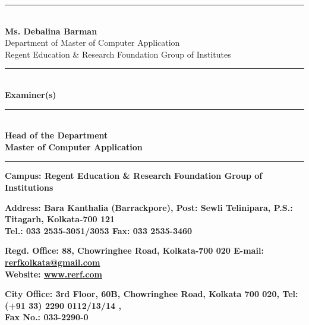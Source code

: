 \documentclass[12pt,a4paper]{report}
\begin{document}
\begin{center}
            \rule{8cm}{0.5pt} \\ %
            \textbf{Ms. Debalina Barman} \\[5pt]
            Department of Master of Computer Application\\
            Regent Education \& Research Foundation Group of Institutes

            \vspace{2cm}

            \noindent
            \begin{minipage}[t]{0.45\textwidth}
                \centering
                \rule{6cm}{0.5pt}\\
                \textbf{Examiner(s)}
            \end{minipage}%
            \hfill
            \begin{minipage}[t]{0.45\textwidth}
                \centering
                \rule{7cm}{0.5pt}\\
                \textbf{Head of the Department}\\[5pt]
                \textbf{Master of Computer Application}
            \end{minipage}

            \vfill %
\vspace{0.25cm}
            \hrule %
        \vspace{0.25cm}
            
            {\scriptsize \textbf{Campus: Regent Education \& Research Foundation Group of Institutions}\\}
          
            
            {\tiny \textbf{Address: Bara Kanthalia (Barrackpore), Post: Sewli Telinipara, P.S.: Titagarh, Kolkata-700 121 \\Tel.: 033 2535-3051/3053 Fax: 033 2535-3460}\\}
          
            
            {\tiny \textbf{Regd. Office: 88, Chowringhee Road, Kolkata-700 020 E-mail: \underline{rerfkolkata@gmail.com} \\Website: \underline{www.rerf.com}}\\}
            
        
            
            {\tiny \textbf{City Office: 3rd Floor, 60B, Chowringhee Road, Kolkata 700 020, Tel: (+91 33) 2290 0112/13/14 , \\Fax No.: 033-2290-0}}
            
           
   
\end{center}
\end{document}
